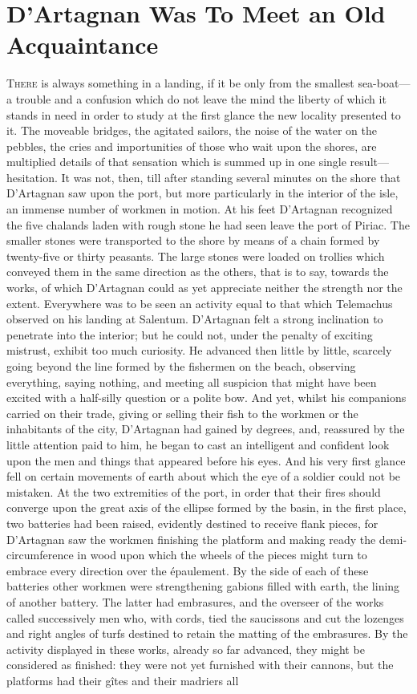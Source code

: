 \chapter{D'Artagnan Was To Meet an Old Acquaintance}

\lettrine{T}{here} is always something in a landing, if it be only from the smallest sea-boat—a trouble and a confusion which do not leave the mind the liberty of which it stands in need in order to study at the first glance the new locality presented to it. The moveable bridges, the agitated sailors, the noise of the water on the pebbles, the cries and importunities of those who wait upon the shores, are multiplied details of that sensation which is summed up in one single result—hesitation. It was not, then, till after standing several minutes on the shore that D'Artagnan saw upon the port, but more particularly in the interior of the isle, an immense number of workmen in motion. At his feet D'Artagnan recognized the five chalands laden with rough stone he had seen leave the port of Piriac. The smaller stones were transported to the shore by means of a chain formed by twenty-five or thirty peasants. The large stones were loaded on trollies which conveyed them in the same direction as the others, that is to say, towards the works, of which D'Artagnan could as yet appreciate neither the strength nor the extent. Everywhere was to be seen an activity equal to that which Telemachus observed on his landing at Salentum. D'Artagnan felt a strong inclination to penetrate into the interior; but he could not, under the penalty of exciting mistrust, exhibit too much curiosity. He advanced then little by little, scarcely going beyond the line formed by the fishermen on the beach, observing everything, saying nothing, and meeting all suspicion that might have been excited with a half-silly question or a polite bow. And yet, whilst his companions carried on their trade, giving or selling their fish to the workmen or the inhabitants of the city, D'Artagnan had gained by degrees, and, reassured by the little attention paid to him, he began to cast an intelligent and confident look upon the men and things that appeared before his eyes. And his very first glance fell on certain movements of earth about which the eye of a soldier could not be mistaken. At the two extremities of the port, in order that their fires should converge upon the great axis of the ellipse formed by the basin, in the first place, two batteries had been raised, evidently destined to receive flank pieces, for D'Artagnan saw the workmen finishing the platform and making ready the demi-circumference in wood upon which the wheels of the pieces might turn to embrace every direction over the épaulement. By the side of each of these batteries other workmen were strengthening gabions filled with earth, the lining of another battery. The latter had embrasures, and the overseer of the works called successively men who, with cords, tied the saucissons and cut the lozenges and right angles of turfs destined to retain the matting of the embrasures. By the activity displayed in these works, already so far advanced, they might be considered as finished: they were not yet furnished with their cannons, but the platforms had their gîtes and their madriers all 